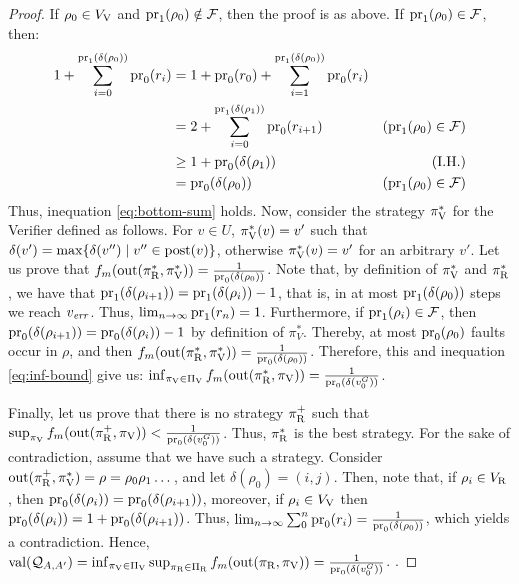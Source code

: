 \begin{proof}
 If $\rho_0 \in V_{\mathrm{V}}$ and $\operatorname{pr}_{1}(\rho_0) \notin \mathcal{F}$, then the proof is as above. If $\operatorname{pr}_{1}(\rho_0) \in \mathcal{F}$, then:
\begin{align*}
 	1+\sum^{\operatorname{pr}_{1}(\delta(\rho_0))}_{i=0} \operatorname{pr}_{0}(r_i) & =  1+\operatorname{pr}_{0}(r_0) + \sum^{\operatorname{pr}_{1}(\delta(\rho_0))}_{i=1} \operatorname{pr}_{0}(r_i) & \\
					     & =  2 +  \sum^{\operatorname{pr}_{1}(\delta(\rho_1))}_{i=0} \operatorname{pr}_{0}(r_{i+1}) &   \text{($\operatorname{pr}_{1}(\rho_0) \in \mathcal{F}$)}\\
					     & \geq 1 + \operatorname{pr}_{0}(\delta(\rho_1)) & \text{(I.H.)} \\
					     & = \operatorname{pr}_{0}(\delta(\rho_0)) & \text{($\operatorname{pr}_{1}(\rho_0) \in \mathcal{F}$)}
\end{align*}
Thus, inequation \ref{eq:bottom-sum} holds. Now, consider the strategy $\pi^*_{\mathrm{V}}$ for the Verifier defined as follows. For $v \in U$, $\pi^*_{\mathrm{V}}(v) = v'$ such that $\delta(v') = \max \{\delta(v'') \mid v'' \in \operatorname{post}(v)\}$, otherwise $\pi^*_{\mathrm{V}}(v) = v'$ for an arbitrary $v'$. 
Let us prove that $f_{m}(\operatorname{out}(\pi^*_{\mathrm{R}}, \pi^*_{\mathrm{V}})) = \frac{1}{\operatorname{pr}_{0}(\delta(\rho_0))}$. 
Note that, by definition of $\pi^*_{\mathrm{V}}$ and $\pi^*_{\mathrm{R}}$, we have that $\operatorname{pr}_{1}(\delta(\rho_{i+1})) = \operatorname{pr}_{1}(\delta(\rho_i)) - 1$, %
that is, in at most $\operatorname{pr}_{1}(\delta(\rho_0))$ steps we reach $v_{\mathit{err}}$. Thus, $\lim_{n \rightarrow \infty}  \operatorname{pr}_{1}(r_n) =1$. 
Furthermore, if $\operatorname{pr}_{1}(\rho_i) \in \mathcal{F}$, then $\operatorname{pr}_{0}(\delta(\rho_{i+1})) = \operatorname{pr}_{0}(\delta(\rho_i)) - 1$
by definition of $\pi^*_V$. Thereby, at most $\operatorname{pr}_{0}(\rho_0)$ faults occur in $\rho$, and then
$f_{m}(\operatorname{out}(\pi^*_{\mathrm{R}}, \pi^*_{\mathrm{V}})) = \frac{1}{\operatorname{pr}_{0}(\delta(\rho_0))}$. Therefore, this and inequation \ref{eq:inf-bound} give us: 
$\inf_{\pi_{\mathrm{V}} \in \Pi_{\mathrm{V}}} f_{m}(\operatorname{out}(\pi^*_{\mathrm{R}}, \pi_{\mathrm{V}})) = \frac{1}{\operatorname{pr}_{0}(\delta(v^G_0))}$. 


Finally, let us prove that there is no
strategy $\pi^+_{\mathrm{R}}$  such that $\sup_{\pi_{\mathrm{V}}} f_{m}(\operatorname{out}(\pi^+_{\mathrm{R}}, \pi_{\mathrm{V}})) < \frac{1}{\operatorname{pr}_{0}(\delta(v^G_0))}$. 
Thus, $\pi^*_{\mathrm{R}}$ is the best strategy. 
For the sake of contradiction, assume that we have such a strategy. Consider $\operatorname{out}(\pi^+_{\mathrm{R}}, \pi^*_{\mathrm{V}}) = \rho = \rho_0 \rho_1 \dots$, 
and let $\delta(\rho_0) = (i,j)$. Then, note that, if $\rho_i \in V_{\mathrm{R}}$, then $\operatorname{pr}_{0}(\delta(\rho_i)) = \operatorname{pr}_{0}(\delta(\rho_{i+1}))$, 
moreover, if $\rho_i \in V_{\mathrm{V}}$ then $\operatorname{pr}_{0}(\delta(\rho_i)) = 1 + \operatorname{pr}_{0}(\delta(\rho_{i+1}))$. 
Thus, $\lim_{n \rightarrow \infty}\sum^n_{0} \operatorname{pr}_{0}(r_i) = \frac{1}{\operatorname{pr}_{0}(\delta(\rho_0))}$, which yields a contradiction.
Hence, $\operatorname{val}(\mathcal{Q}_{A, A'}) = \inf_{\pi_{\mathrm{V}} \in \Pi_{\mathrm{V}}} \sup_{\pi_{\mathrm{R}} \in \Pi_{\mathrm{R}}} f_{m}(\operatorname{out}(\pi_{\mathrm{R}}, \pi_{\mathrm{V}})) = \frac{1}{\operatorname{pr}_{0}(\delta(v^G_0))}$.
\qedhere
.


\end{proof}

